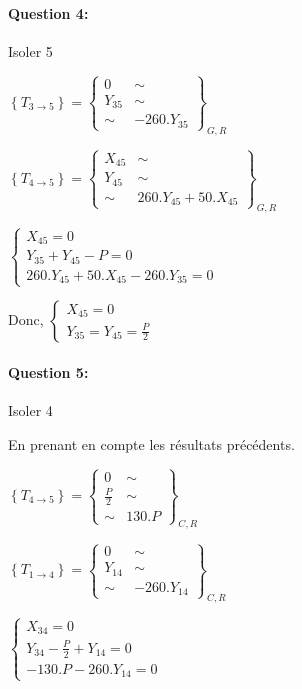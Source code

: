 \paragraph{Question 4:}

Isoler 5

$\left\{T_{3\rightarrow 5}\right\}=\left\{
\begin{array}{cc}
0 & \sim \\
Y_{35} & \sim \\
\sim & -260.Y_{35}
\end{array}
\right\}_{G,R}$

$\left\{T_{4\rightarrow 5}\right\}=\left\{
\begin{array}{cc}
X_{45} & \sim \\
Y_{45} & \sim \\
\sim & 260.Y_{45}+50.X_{45}
\end{array}
\right\}_{G,R}$

$\left\{\begin{array}{l}
X_{45}=0 \\
Y_{35}+Y_{45}-P=0 \\
260.Y_{45}+50.X_{45}-260.Y_{35}=0
\end{array}\right.$

Donc, $\left\{\begin{array}{l}
X_{45}=0 \\
Y_{35}=Y_{45}=\frac{P}{2}
\end{array}\right.$

\paragraph{Question 5:}

Isoler 4

En prenant en compte les résultats précédents.

$\left\{T_{4\rightarrow 5}\right\}=\left\{
\begin{array}{cc}
0 & \sim \\
\frac{P}{2} & \sim \\
\sim & 130.P
\end{array}
\right\}_{C,R}$

$\left\{T_{1\rightarrow 4}\right\}=\left\{
\begin{array}{cc}
0 & \sim \\
Y_{14} & \sim \\
\sim & -260.Y_{14}
\end{array}
\right\}_{C,R}$

$\left\{\begin{array}{l}
X_{34}=0 \\
Y_{34}-\frac{P}{2}+Y_{14}=0 \\
-130.P-260.Y_{14}=0
\end{array}\right.$

